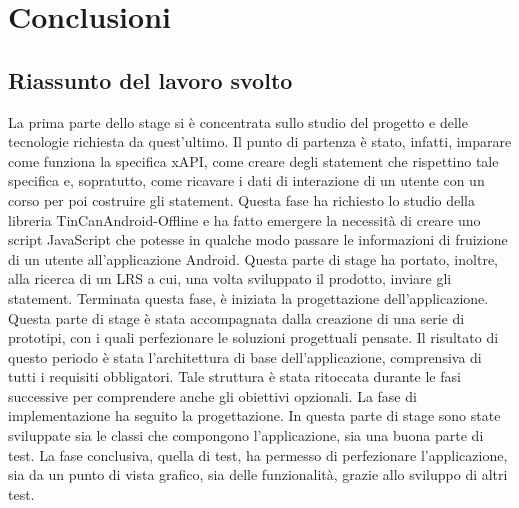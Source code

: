\documentclass[../Tesi.tex]{subfiles}
\begin{document}
\section{Conclusioni}
	\subsection{Riassunto del lavoro svolto}
	La prima parte dello stage si è concentrata sullo studio del progetto e delle tecnologie richiesta da quest'ultimo. Il punto di partenza è stato, infatti, imparare come funziona la specifica xAPI, come creare degli statement che rispettino tale specifica e, sopratutto, come ricavare i dati di interazione di un utente con un corso per poi costruire gli statement. Questa fase ha richiesto lo studio della libreria TinCanAndroid-Offline e ha fatto emergere la necessità di creare uno script JavaScript che potesse in qualche modo passare le informazioni di fruizione di un utente all'applicazione Android. Questa parte di stage ha portato, inoltre, alla ricerca di un LRS a cui, una volta sviluppato il prodotto, inviare gli statement. Terminata questa fase, è iniziata la progettazione dell'applicazione. Questa parte di stage è stata accompagnata dalla creazione di una serie di prototipi, con i quali perfezionare le soluzioni progettuali pensate. Il risultato di questo periodo è stata l'architettura di base dell'applicazione, comprensiva di tutti i requisiti obbligatori. Tale struttura è stata ritoccata durante le fasi successive per comprendere anche gli obiettivi opzionali. La fase di implementazione ha seguito la progettazione. In questa parte di stage sono state sviluppate sia le classi che compongono l'applicazione, sia una buona parte di test. La fase conclusiva, quella di test, ha permesso di perfezionare l'applicazione, sia da un punto di vista grafico, sia delle funzionalità, grazie allo sviluppo di altri test.\\
\end{document}
